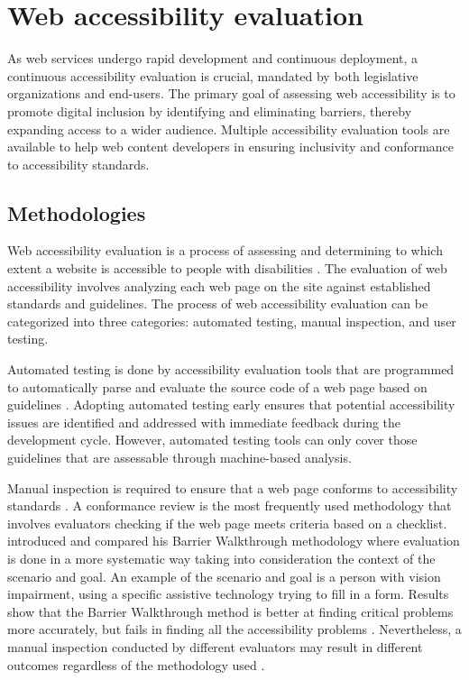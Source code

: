 \chapter{Web accessibility evaluation\label{accessibility_evaluation}}

As web services undergo rapid development and continuous deployment, a continuous accessibility evaluation is crucial, mandated by both legislative organizations and end-users. The primary goal of assessing web accessibility is to promote digital inclusion by identifying and eliminating barriers, thereby expanding access to a wider audience. Multiple accessibility evaluation tools are available to help web content developers in ensuring inclusivity and conformance to accessibility standards.

\section{Methodologies}

Web accessibility evaluation is a process of assessing and determining to which extent a website is accessible to people with disabilities \citep[Chapter~26.2]{webaccessibility}. The evaluation of web accessibility involves analyzing each web page on the site against established standards and guidelines. The process of web accessibility evaluation can be categorized into three categories: automated testing, manual inspection, and user testing.

Automated testing is done by accessibility evaluation tools that are programmed to automatically parse and evaluate the source code of a web page based on guidelines \citep[Chapter~26.2]{webaccessibility}. Adopting automated testing early ensures that potential accessibility issues are identified and addressed with immediate feedback during the development cycle. However, automated testing tools can only cover those guidelines that are assessable through machine-based analysis.

Manual inspection is required to ensure that a web page conforms to accessibility standards \citep[Chapter~26.2]{webaccessibility}. A conformance review is the most frequently used methodology that involves evaluators checking if the web page meets criteria based on a checklist. \textcite{comparative_accessibility_methods} introduced and compared his Barrier Walkthrough methodology where evaluation is done in a more systematic way taking into consideration the context of the scenario and goal. An example of the scenario and goal is a person with vision impairment, using a specific assistive technology trying to fill in a form. Results show that the Barrier Walkthrough method is better at finding critical problems more accurately, but fails in finding all the accessibility problems \citep{comparative_accessibility_methods}. Nevertheless, a manual inspection conducted by different evaluators may result in different outcomes regardless of the methodology used \citep{accessibility_evaluation_experts, 10.1145/1878803.1878813_testability_expertise}. 

